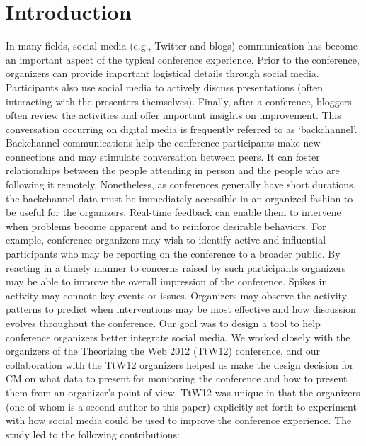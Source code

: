 \documentclass[conference,final]{IEEEtran}
\begin{document}
\section{Introduction}
In many fields, social media (e.g., Twitter and blogs) communication has become an important aspect of the typical conference experience. Prior to the conference, organizers can provide important logistical details through social media. Participants also use social media to actively discuss presentations (often interacting with the presenters themselves). Finally, after a conference, bloggers often review the activities and offer important insights on improvement. This conversation occurring on digital media is frequently referred to as `backchannel'. Backchannel communications help the conference participants make new connections and may stimulate conversation between peers. It can foster relationships between the people attending in person and the people who are following it remotely. Nonetheless, as conferences generally have short durations, the backchannel data must be immediately accessible in an organized fashion to be useful for the organizers. Real-time feedback can enable them to intervene when problems become apparent and to reinforce desirable behaviors. For example, conference organizers may wish to identify active and influential participants who may be reporting on the conference to a broader public. By reacting in a timely manner to concerns raised by such participants organizers may be able to improve the overall impression of the conference. Spikes in activity may connote key events or issues. Organizers may observe the activity patterns to predict when interventions may be most effective and how discussion evolves throughout the conference. Our goal was to design a tool to help conference organizers better integrate social media. We worked closely with the organizers of the Theorizing the Web 2012 (TtW12) conference, and our collaboration with the TtW12 organizers helped us make the design decision for CM on what data to present for monitoring the conference and how to present them from an organizer's point of view. TtW12 was unique in that the organizers (one of whom is a second author to this paper) explicitly set forth to experiment with how social media could be used to improve the conference experience. The study led to the following contributions:
\end{document}
